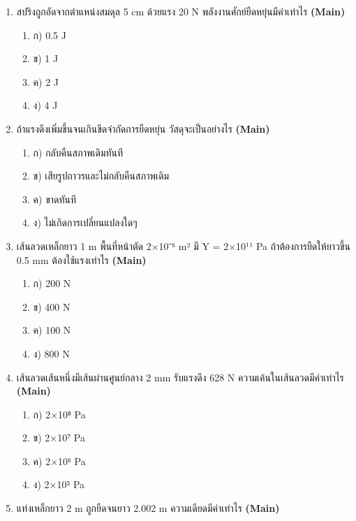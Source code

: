 \documentclass[12pt]{article}
\begin{document}
\begin{enumerate}[label=\arabic*.]
\begin{enumerate}[label=)]
\item ก) วัสดุ A แข็งกว่า แต่เปราะกว่า
\item ข) วัสดุ A ทนต่อแรงดึงได้ดีกว่าต่อการยืดที่เท่ากัน
\item ค) วัสดุ A ยืดได้มากกว่า
\item ง) วัสดุ A หนักกว่า
\end{enumerate}
\item สปริงถูกอัดจากตำแหน่งสมดุล 5 cm ด้วยแรง 20 N พลังงานศักย์ยืดหยุ่นมีค่าเท่าไร \hfill \textbf{\small (Main)}
\begin{enumerate}[label=)]
\item ก) 0.5 J
\item ข) 1 J
\item ค) 2 J
\item ง) 4 J
\end{enumerate}
\item ถ้าแรงดึงเพิ่มขึ้นจนเกินขีดจำกัดการยืดหยุ่น วัสดุจะเป็นอย่างไร \hfill \textbf{\small (Main)}
\begin{enumerate}[label=)]
\item ก) กลับคืนสภาพเดิมทันที
\item ข) เสียรูปถาวรและไม่กลับคืนสภาพเดิม
\item ค) ขาดทันที
\item ง) ไม่เกิดการเปลี่ยนแปลงใดๆ
\end{enumerate}
\item เส้นลวดเหล็กยาว 1 m พื้นที่หน้าตัด 2×10⁻⁶ m² มี Y = 2×10¹¹ Pa ถ้าต้องการยืดให้ยาวขึ้น 0.5 mm ต้องใช้แรงเท่าไร \hfill \textbf{\small (Main)}
\begin{enumerate}[label=)]
\item ก) 200 N
\item ข) 400 N
\item ค) 100 N
\item ง) 800 N
\end{enumerate}
\item เส้นลวดเส้นหนึ่งมีเส้นผ่านศูนย์กลาง 2 mm รับแรงดึง 628 N ความเค้นในเส้นลวดมีค่าเท่าไร \hfill \textbf{\small (Main)}
\begin{enumerate}[label=)]
\item ก) 2×10⁸ Pa
\item ข) 2×10⁷ Pa
\item ค) 2×10⁶ Pa
\item ง) 2×10⁵ Pa
\end{enumerate}
\item แท่งเหล็กยาว 2 m ถูกยืดจนยาว 2.002 m ความเดียดมีค่าเท่าไร \hfill \textbf{\small (Main)}

\end{enumerate}
\end{document}
